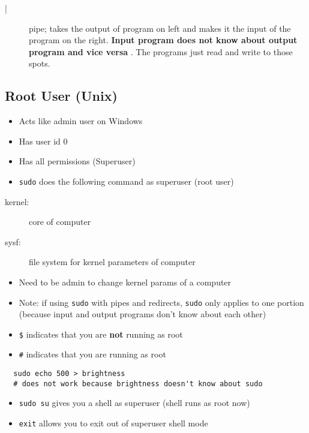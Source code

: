 \documentclass[letterpaper,12pt]{article}
\begin{document}
\begin{description}
 \item[|] pipe; takes the output of program on left and makes it the input of the program on the right.  \textbf{Input program does not know about output program and vice versa} . The programs just read and write to those spots.
\end{description}

\subsection{Root User (Unix)}
\begin{itemize}
 \item Acts like admin user on Windows
 \item Has user id 0
 \item Has all permissions (Superuser)
 \item \lstinline{sudo} does the following command as superuser (root user)
\end{itemize}

\begin{description}
 \item[kernel:] core of computer
 \item[sysf:] file system for kernel parameters of computer
\end{description}

\begin{itemize}
 \item Need to be admin to change kernel params of a computer
 \item Note: if using \lstinline{sudo} with pipes and redirects, \lstinline{sudo} only applies to one portion (because input and output programs don't know about each other)
 \item \lstinline{$} indicates that you are \textbf{not} running as root
 \item \lstinline{#} indicates that you are running as root
\end{itemize}

\begin{lstlisting}
  sudo echo 500 > brightness
  # does not work because brightness doesn't know about sudo
\end{lstlisting}

\begin{itemize}
 \item \lstinline{sudo su} gives you a shell as superuser (shell runs as root now)
 \item \lstinline{exit} allows you to exit out of superuser shell mode
\end{itemize}
\end{document}
